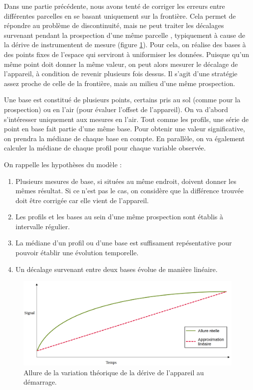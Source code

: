 \documentclass[12pt]{article}
\begin{document}
    \label{2_evol_base} Dans une partie précédente, nous avons tenté de corriger les erreurs entre différentes parcelles en se basant uniquement sur la frontière. Cela permet de répondre au problème de discontinuité, mais ne peut traiter les décalages survenant pendant la prospection d'une même parcelle , typiquement à cause de la dérive de instrumentent de mesure (figure \ref{fig:2_ep_vt}). Pour cela, on réalise des bases à des points fixes de l'espace qui serviront à uniformiser les données. Puisque qu'un même point doit donner la même valeur, on peut alors mesurer le décalage de l'appareil, à condition de revenir plusieurs fois dessus. Il s'agit d'une stratégie assez proche de celle de la frontière, mais au milieu d'une même prospection.

    Une base est constitué de plusieurs points, certains pris au sol (comme pour la prospection) ou en l'air (pour évaluer l'offset de l'appareil). On va d'abord s'intéresser uniquement aux mesures en l'air. Tout comme les profils, une série de point en base fait partie d'une même base. Pour obtenir une valeur significative, on prendra la médiane de chaque base en compte. En parallèle, on va également calculer la médiane de chaque profil pour chaque variable observée.

    On rappelle les hypothèses du modèle :
    \begin{enumerate}
        \item[\textbf{(1)}] Plusieurs mesures de base, si situées au même endroit, doivent donner les mêmes résultat. Si ce n'est pas le cas, on considère que la différence trouvée doit être corrigée car elle vient de l'appareil.
        \item[\textbf{(2)}] Les profils et les bases au sein d'une même prospection sont établis à intervalle régulier.
        \item[\textbf{(3)}] La médiane d'un profil ou d'une base est suffisament repésentative pour pouvoir établir une évolution temporelle.
        \item[\textbf{(4)}] Un décalage survenant entre deux bases évolue de manière linéaire.
    \end{enumerate}

    \begin{figure}[ht!]
        \centering
        \includegraphics[width=\textwidth]{Images/Base_Vrai_Evol.png}  
        \caption{Allure de la variation théorique de la dérive de l'appareil au démarrage.}
        \label{fig:2_ep_vt}
    \end{figure}
\end{document}

